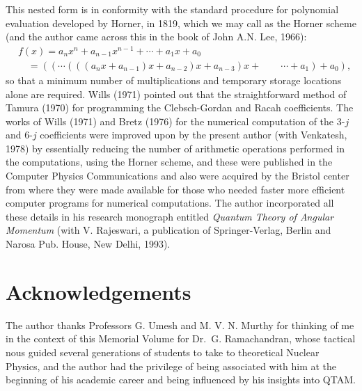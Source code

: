 This nested form is in conformity with the standard procedure for polynomial evaluation developed by Horner, in 1819, which we may call as the Horner scheme (and the author came across this in the book of John A.N. Lee, 1966):
\begin{equation}
\begin{split}
& f(x) = a_nx^n + a_{n-1}x^{n-1} + \cdots + a_1x + a_0 \\
& \quad = ((\cdots (((a_nx+ a_{n-1})x + a_{n-2})x + a_{n-3})x + \qquad \cdots + a_1) + a_0), \label{chap29-eq61}
\end{split}
\end{equation}
so that a minimum number of multiplications and temporary storage locations alone are required. Wills (1971) pointed out that the straightforward method of Tamura (1970) for programming the Clebsch-Gordan and Racah coefficients. The works of Wills (1971) and Bretz (1976) for the numerical computation of the 3-$j$ and 6-$j$ coefficients were improved upon by the present author (with Venkatesh, 1978) by essentially reducing the number of arithmetic operations performed in the computations, using the Horner scheme, and these were published in the Computer Physics Communications and also were acquired by the Bristol center from where they were made available for those who needed faster more efficient computer programs for numerical computations. The author incorporated all these details in his research monograph entitled \textit{Quantum Theory of Angular Momentum} (with V. Rajeswari, a publication of Springer-Verlag, Berlin and Narosa Pub. House, New Delhi, 1993).

\section*{Acknowledgements}

The author thanks Professors G. Umesh and M. V. N. Murthy 
for thinking of me in the context of this Memorial Volume for Dr.\ G. Ramachandran, whose tactical nous guided several generations of students to take to theoretical Nuclear Physics, and the author had the privilege of being associated with him at the beginning of his academic career and being influenced by his insights into QTAM.

